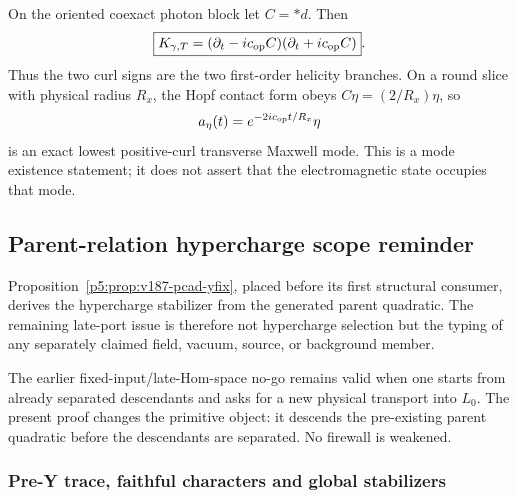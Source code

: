 \documentclass[11pt,a4paper]{article}
\begin{document}
\begin{corollary}
\label{p5:cor:v244-photon-helicity-hopf-mode}
On the oriented coexact photon block let \(C=*d\).  Then
\[
 \boxed{K_{\gamma,T}
 =(\partial_t-i c_{\rm op}C)(\partial_t+i c_{\rm op}C)}.
\]
Thus the two curl signs are the two first-order helicity branches.  On a
round slice with physical radius \(R_x\), the Hopf contact form obeys
\(C\eta=(2/R_x)\eta\), so
\[
 a_\eta(t)=e^{-2ic_{\rm op}t/R_x}\eta
\]
is an exact lowest positive-curl transverse Maxwell mode.  This is a mode
existence statement; it does not assert that the electromagnetic state
occupies that mode.
\end{corollary}

\clearpage


\subsection{Parent-relation hypercharge scope reminder}
\label{p5:sec:v187-pcad-yfix}
Proposition~\ref{p5:prop:v187-pcad-yfix}, placed before its first structural
consumer, derives the hypercharge stabilizer from the generated parent
quadratic.  The remaining late-port issue is therefore not hypercharge
selection but the typing of any separately claimed field, vacuum, source, or
background member.

\begin{remark}
\label{p5:rem:v187-yfix-late-port-firewall}
The earlier fixed-input/late-Hom-space no-go remains valid when one starts from
already separated descendants and asks for a new physical transport into
$L_0$.  The present proof changes the primitive object: it descends the
pre-existing parent quadratic before the descendants are separated.  No
firewall is weakened.
\end{remark}


\subsubsection{Pre-Y trace, faithful characters and global stabilizers}
\end{document}
